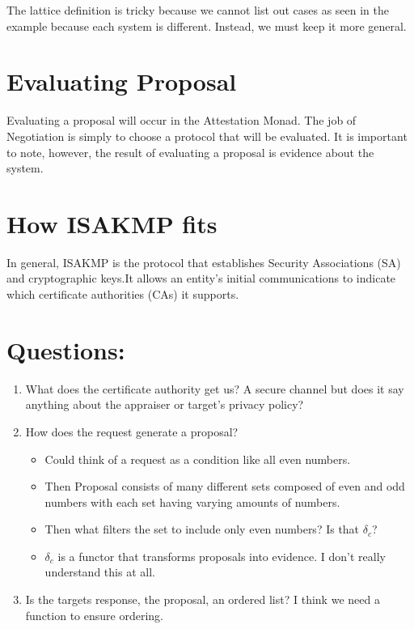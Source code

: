 \documentclass[10pt]{report}
\begin{document}
	The lattice definition is tricky because we cannot list out cases as seen in the example because each system is different. Instead, we must keep it more general. 

\section {Evaluating Proposal}

Evaluating a proposal will occur in the Attestation Monad. The job of Negotiation is simply to choose a protocol that will be evaluated. It is important to note, however, the result of evaluating a proposal is evidence about the system.  

\section {How ISAKMP fits} 

In general, ISAKMP is the protocol that establishes Security Associations (SA) and cryptographic keys.It allows an entity's initial communications to indicate which certificate authorities (CAs) it supports.   

\section {Questions:}
\begin{enumerate}
  \item What does the certificate authority get us? A secure channel but 
        does it say anything about the appraiser or target's
        privacy policy?
  \item How does the request generate a proposal? 
  \begin{itemize}
    \item Could think of a request as a condition like all even numbers.
    \item Then Proposal consists of many different sets composed of even
          and odd numbers with each set having varying amounts of numbers.
    \item Then what filters the set to include only even numbers?
          Is that $\delta_c$?
    \item $\delta_c$ is a functor that transforms proposals into evidence.
          I don't really understand this at all.  
  \end{itemize}
  \item Is the targets response, the proposal, an ordered list?
        I think we need a function to ensure ordering.
\end{enumerate}
\end{document}
